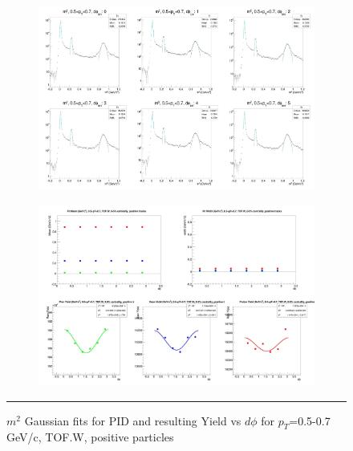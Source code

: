 \begin{figure}[H]
  \centering
    \begin{subfigure}[p]{1\textwidth}
    \includegraphics[width=1\textwidth]{lowptfits/yieldvsdphi_tof1_cent0_ch1_pT-5-7.jpg}
    \end{subfigure}
    \begin{subfigure}[p]{1\textwidth}
    \includegraphics[width=1\textwidth]{lowptfits/fitParams_tof1_cent0_ch1_pT-5-7.jpg}
    \end{subfigure}
    \rule{35em}{0.5pt}
  \caption[PID fits and Yield vs $d\phi$ for $p_T$=0.5-0.7 GeV/c, TOF.W, positive particles ]{$m^2$ Gaussian fits for PID and resulting Yield vs $d\phi$ for $p_T$=0.5-0.7 GeV/c, TOF.W, positive particles}
  \label{fig:fits5-7pos}
\end{figure}

